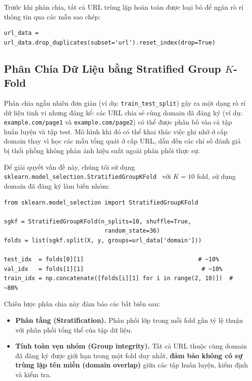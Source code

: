 \documentclass[a4paper,12pt]{article}
\begin{document}
Trước khi phân chia, tất cả URL trùng lặp hoàn toàn được loại bỏ để ngăn rò rỉ thông tin qua các mẫu sao chép:

\begin{lstlisting}[caption={Loại bỏ trùng lặp}]
url_data = url_data.drop_duplicates(subset='url').reset_index(drop=True)
\end{lstlisting}

\subsection{Phân Chia Dữ Liệu bằng Stratified Group $K$-Fold}
\label{sec:split}

Phân chia ngẫu nhiên đơn giản (ví dụ: \texttt{train\_test\_split}) gây ra một dạng rò rỉ dữ liệu tinh vi nhưng đáng kể: các URL chia sẻ cùng domain đã đăng ký (ví dụ: \texttt{example.com/page1} và \texttt{example.com/page2}) có thể được phân bố vào cả tập huấn luyện và tập test. Mô hình khi đó có thể khai thác việc ghi nhớ ở cấp domain thay vì học các mẫu tổng quát ở cấp URL, dẫn đến các chỉ số đánh giá bị thổi phồng không phản ánh hiệu suất ngoài phân phối thực sự.

Để giải quyết vấn đề này, chúng tôi sử dụng \texttt{sklearn.model\_selection.StratifiedGroupKFold}~\cite{sklearn} với $K{=}10$ fold, sử dụng domain đã đăng ký làm biến nhóm:

\begin{lstlisting}[caption={Phân chia Stratified Group $K$-Fold}]
from sklearn.model_selection import StratifiedGroupKFold

sgkf = StratifiedGroupKFold(n_splits=10, shuffle=True,
                             random_state=36)
folds = list(sgkf.split(X, y, groups=url_data['domain']))

test_idx  = folds[0][1]                                 # ~10%
val_idx   = folds[1][1]                                  # ~10%
train_idx = np.concatenate([folds[i][1] for i in range(2, 10)])  # ~80%
\end{lstlisting}

Chiến lược phân chia này đảm bảo các bất biến sau:
\begin{itemize}
    \item \textbf{Phân tầng (Stratification).} Phân phối lớp trong mỗi fold gần tỷ lệ thuận với phân phối tổng thể của tập dữ liệu.
    \item \textbf{Tính toàn vẹn nhóm (Group integrity).} Tất cả URL thuộc cùng domain đã đăng ký được giới hạn trong một fold duy nhất, \textbf{đảm bảo không có sự trùng lặp tên miền (domain overlap)} giữa các tập huấn luyện, kiểm định và kiểm tra.
\end{itemize}
\end{document}
